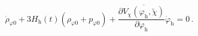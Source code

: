 \begin{equation}                              \label{dorrhoa}
 \dot{\rho}_{\varphi 0}+3H_{\text{h}}(t)(\rho_{\varphi 0}+p_{\varphi 0})
 +\frac{\partial\overline{V_{\chi}(\varphi_{\text{h}},\tilde{\chi})}}
 {\partial \varphi_{\text{h}}}\dot{\varphi}_{\text{h}}=0\,.
\end{equation}

